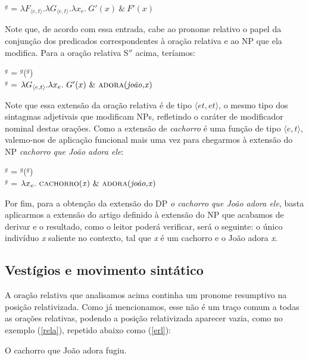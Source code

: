 \begin{exe}
	\ex {}$^{g}$ = $\lambda F_{\langle e,t\rangle}.\lambda G_{\langle e,t\rangle}.\lambda x_{e}.\ G'(x)\ \&\ F'(x)$
\end{exe}

\n Note que, de acordo com essa entrada, cabe ao pronome relativo o papel da conjunção dos predicados correspondentes à oração relativa e ao NP que ela modifica. Para a oração relativa S$''$ acima, teríamos:

\begin{exe}
	\ex {}$^{g}$ = $^{g}$($^{g}$) \\
	$^{g}$ = $\lambda G_{\langle e,t\rangle}.\lambda x_{e}.\ G'(x)\ \&\ \text{\textsc{adora}(\textit{joão,x})}$
\end{exe}

\n Note que essa extensão da oração relativa é de tipo $\langle et,et\rangle$, o mesmo tipo dos sintagmas adjetivais que modificam NPs, refletindo o caráter de modificador nominal destas orações. Como a extensão de \textit{cachorro} é uma função de tipo
$\langle e,t\rangle$, valemo-nos de aplicação funcional mais uma
vez para chegarmos à extensão do NP \textit{cachorro que João
adora ele}:

\begin{exe}
	\ex {}$^{g}$ = $^{g}$($^{g}$)\\
	$^{g}$ = $\lambda x_{e}.\ \predica{cachorro}{x}\ \&\ \predica{adora}{joão,x}$
\end{exe}

\n Por fim, para a obtenção da extensão do DP \textit{o cachorro
que João adora ele}, basta aplicarmos a extensão do artigo definido
à extensão do NP que acabamos de derivar e o resultado, como o
leitor poderá verificar, será o seguinte: o único indivíduo
\textit{x} saliente no contexto, tal que \textit{x} é um cachorro
e o João adora \textit{x}.

\subsection{Vestígios e movimento sintático}

\n A oração relativa que analisamos acima continha um pronome
resumptivo na posição relativizada. Como já mencionamos, esse não
é um traço comum a todas as orações relativas, podendo a posição
relativizada aparecer vazia, como no exemplo (\ref{rela}),
repetido abaixo como (\ref{erl}):

\begin{exe}
    \ex O cachorro que João adora fugiu. \label{erl}
\end{exe}

